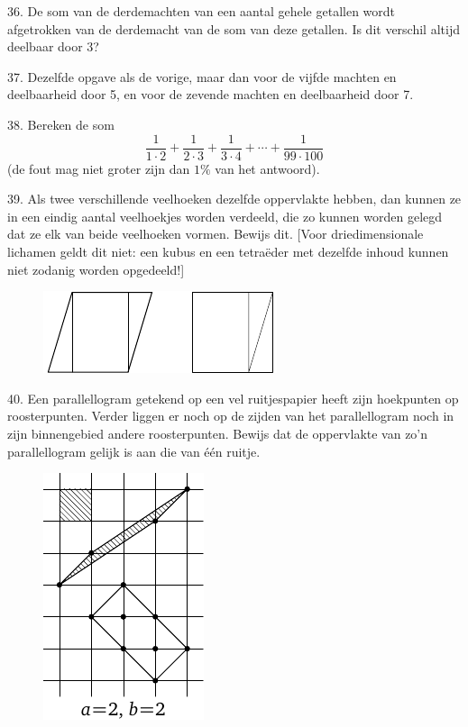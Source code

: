 \begin{problem}{36.}
	De som van de derdemachten van een aantal gehele getallen wordt afgetrokken van de derdemacht van de som van deze getallen. Is dit verschil altijd deelbaar door 3?
\end{problem}

\begin{problem}{37.}
	Dezelfde opgave als de vorige, maar dan voor de vijfde machten en deelbaarheid door 5, en voor de zevende machten en deelbaarheid door 7.
\end{problem}

\begin{problem}{38.}
	Bereken de som
	\begin{equation*}
		\frac{1}{1 \cdot 2} + \frac{1}{2 \cdot 3} + \frac{1}{3 \cdot 4} + \dotsb + \frac{1}{99 \cdot 100}
	\end{equation*}
	(de fout mag niet groter zijn dan $1\%$ van het antwoord).
\end{problem}

\begin{problem}{39.}
	Als twee verschillende veelhoeken dezelfde oppervlakte hebben, dan kunnen ze in een eindig aantal veelhoekjes worden verdeeld, die zo kunnen worden gelegd dat ze elk van beide veelhoeken vormen. Bewijs dit. [Voor driedimensionale lichamen geldt dit niet: een kubus en een tetraëder met dezelfde inhoud kunnen niet zodanig worden opgedeeld!]
	\begin{figure}
		\includegraphics{resources/q39_horizontal}
	\end{figure}
\end{problem}

\clearpage

\begin{problem}{40.}
	Een parallellogram getekend op een vel ruitjespapier heeft zijn hoekpunten op roosterpunten. Verder liggen er noch op de zijden van het parallellogram noch in zijn binnengebied andere roosterpunten. Bewijs dat de oppervlakte van zo'n parallellogram gelijk is aan die van één ruitje.
	\begin{figure}
		\includegraphics{resources/taskbook-24}
	\end{figure}
\end{problem}

